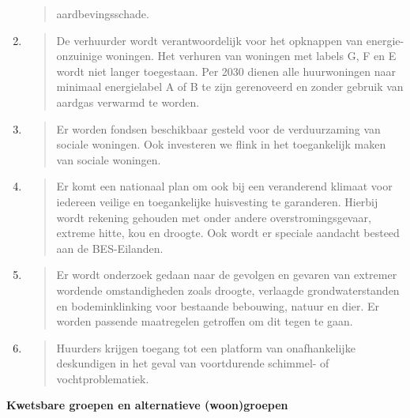 \begin{enumerate}
\begin{quote}
  aardbevingsschade.
  \end{quote}
\item
  \begin{quote}
  De verhuurder wordt verantwoordelijk voor het opknappen van
  energie-onzuinige woningen. Het verhuren van woningen met labels G, F
  en E wordt niet langer toegestaan. Per 2030 dienen alle huurwoningen
  naar minimaal energielabel A of B te zijn gerenoveerd en zonder
  gebruik van aardgas verwarmd te worden.
  \end{quote}
\item
  \begin{quote}
  Er worden fondsen beschikbaar gesteld voor de verduurzaming van
  sociale woningen. Ook investeren we flink in het toegankelijk maken
  van sociale woningen.
  \end{quote}
\item
  \begin{quote}
  Er komt een nationaal plan om ook bij een veranderend klimaat voor
  iedereen veilige en toegankelijke huisvesting te garanderen. Hierbij
  wordt rekening gehouden met onder andere overstromingsgevaar, extreme
  hitte, kou en droogte. Ook wordt er speciale aandacht besteed aan de
  BES-Eilanden.
  \end{quote}
\item
  \begin{quote}
  Er wordt onderzoek gedaan naar de gevolgen en gevaren van extremer
  wordende omstandigheden zoals droogte, verlaagde grondwaterstanden en
  bodeminklinking voor bestaande bebouwing, natuur en dier. Er worden
  passende maatregelen getroffen om dit tegen te gaan.
  \end{quote}
\item
  \begin{quote}
  Huurders krijgen toegang tot een platform van onafhankelijke
  deskundigen in het geval van voortdurende schimmel- of
  vochtproblematiek.
  \end{quote}
\end{enumerate}

\textbf{Kwetsbare groepen en alternatieve (woon)groepen}

